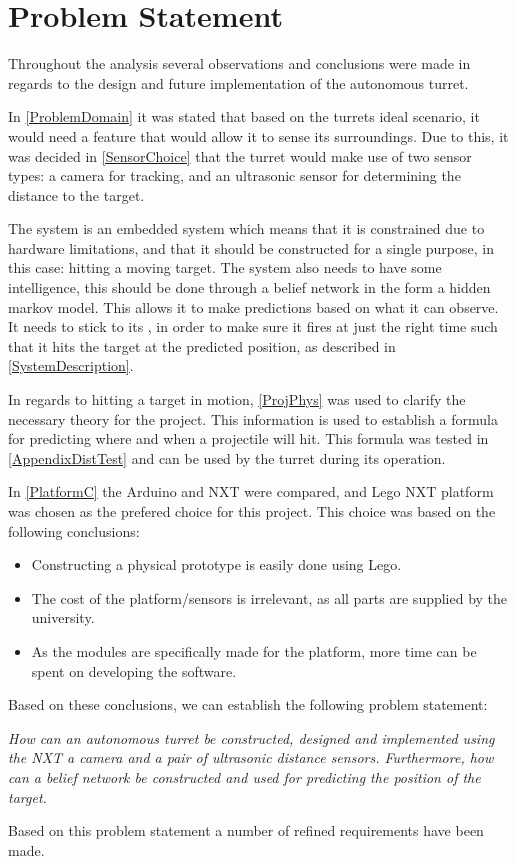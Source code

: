 \chapter{Problem Statement}

Throughout the analysis several observations and conclusions were made in
regards to the design and future implementation of the autonomous turret. 

In \autoref{ProblemDomain} it was stated that based on the turrets ideal
scenario, it would need a feature that would allow it to sense its
surroundings. Due to this, it was decided in \autoref{SensorChoice} that the
turret would make use of two sensor types: a camera for tracking, and an
ultrasonic sensor for determining the distance to the target.\nl

The system is an embedded system which means that it is constrained due to
hardware limitations, and that it should be constructed for a single purpose,
in this case: hitting a moving target. The system also needs to have some
intelligence, this should be done through a belief network in the form a hidden
markov model. This allows it to make predictions based on what it can
observe. It needs to stick to its , in order to
make sure it fires at just the right time such that it hits the target at the predicted
position, as described in \autoref{SystemDescription}.\nl

In regards to hitting a target in motion, \autoref{ProjPhys} was used to
clarify the necessary theory for the project. This information is used to
establish a formula for predicting where and when a projectile will hit. This
formula was tested in \autoref{AppendixDistTest} and can be used by the turret
during its operation.\nl

In \autoref{PlatformC} the Arduino and NXT were compared, and Lego NXT
platform was chosen as the prefered choice for this project. This choice was
based on the following conclusions:
\begin{itemize}
  \item Constructing a physical prototype is easily done using Lego.
  \item The cost of the platform/sensors is irrelevant, as all parts are
  supplied by the university.
  \item As the modules are specifically made for the platform, more time can be
  spent on developing the software.
\end{itemize}

Based on these conclusions, we can establish the following
problem statement:

\begin{center}
\begin{minipage}{0.8\linewidth}
\textit{How can an autonomous turret be constructed, designed and implemented
using the NXT a camera and a pair of ultrasonic distance sensors. Furthermore,
how can a belief network be constructed and used for predicting the position
of the target.}
\end{minipage}
\end{center}

Based on this problem statement a number of refined requirements have been made.

